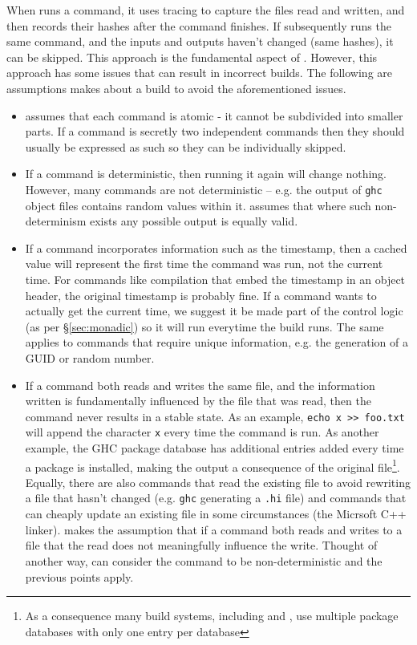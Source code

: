 When \Rattle runs a command, it uses tracing to capture the files read and written, and then records their hashes after the command finishes. If \Rattle subsequently runs the same command, and the inputs and outputs haven't changed (same hashes), it can be skipped. This approach is the fundamental aspect of \Fabricate\citep{fabricate}. However, this approach has some issues that can result in incorrect builds.  The following are assumptions \Rattle makes about a build to avoid the aforementioned issues.


\begin{itemize}
\item \Rattle assumes that each command is atomic - it cannot be subdivided into smaller parts. If a command is secretly two independent commands then they should usually be expressed as such so they can be individually skipped.

\item If a command is deterministic, then running it again will change nothing. However, many commands are not deterministic -- e.g. the output of \texttt{ghc} object files contains random values within it. \Rattle assumes that where such non-determinism exists any possible output is equally valid.

\item If a command incorporates information such as the timestamp, then a cached value will represent the first time the command was run, not the current time. For commands like compilation that embed the timestamp in an object header, the original timestamp is probably fine.  If a command wants to actually get the current time, we suggest it be made part of the control logic (as per \S\ref{sec:monadic}) so it will run everytime the build runs. The same applies to commands that require unique information, e.g. the generation of a GUID or random number.

\item If a command both reads and writes the same file, and the information written is fundamentally influenced by the file that was read, then the command never results in a stable state. As an example, \verb"echo x >> foo.txt" will append the character \texttt{x} every time the command is run. As another example, the GHC package database has additional entries added every time a package is installed, making the output a consequence of the original file\footnote{As a consequence many build systems, including \Bazel and \Rattle, use multiple package databases with only one entry per database}. Equally, there are also commands that read the existing file to avoid rewriting a file that hasn't changed (e.g. \texttt{ghc} generating a \texttt{.hi} file) and commands that can cheaply update an existing file in some circumstances (the Micrsoft C++ linker). \Rattle makes the assumption that if a command both reads and writes to a file that the read does not meaningfully influence the write. Thought of another way, \Rattle can consider the command to be non-deterministic and the previous points apply.


\end{itemize}
